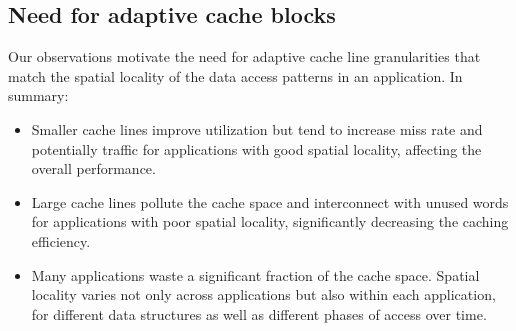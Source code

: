 \subsection{Need for adaptive cache blocks}
Our observations motivate the need for adaptive cache line
granularities that match the spatial locality of the data access patterns
in an application. In summary:
\begin{itemize}
  \item  Smaller cache lines improve utilization but tend to increase
    miss rate and potentially traffic for applications with good
    spatial locality, affecting the overall performance.
  \item Large cache lines pollute the cache space and interconnect
    with unused words for applications with poor spatial locality, 
   significantly decreasing the caching efficiency.
\item Many applications waste a significant fraction of the cache
  space. Spatial locality varies not only across applications but also
  within each application, for different data structures as well as 
  different phases of access over time.   
\end{itemize}


